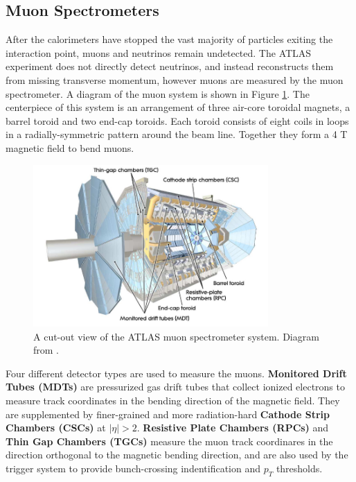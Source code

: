\subsection{Muon Spectrometers}
After the calorimeters have stopped the vast majority of particles exiting the interaction point, muons and neutrinos remain undetected. The ATLAS experiment does not directly detect neutrinos, and instead reconstructs them from missing transverse momentum, however muons are measured by the muon spectrometer. A diagram of the muon system is shown in Figure \ref{fig:muon_system}. The centerpiece of this system is an arrangement of three air-core toroidal magnets, a barrel toroid and two end-cap toroids. Each toroid consists of eight coils in loops in a radially-symmetric pattern around the beam line. Together they form a 4 T magnetic field to bend muons.

\begin{figure}[H]
    \centering
    \includegraphics[width=0.8\textwidth]{Figures/2/muon_system.png}
    \caption{A cut-out view of the ATLAS muon spectrometer system. Diagram from \cite{ATLASDesign}.}
    \label{fig:muon_system}
\end{figure}

Four different detector types are used to measure the muons. \textbf{Monitored Drift Tubes (MDTs)} are pressurized gas drift tubes that collect ionized electrons to measure track coordinates in the bending direction of the magnetic field. They are supplemented by finer-grained and more radiation-hard \textbf{Cathode Strip Chambers (CSCs)} at $|\eta | > 2$. \textbf{Resistive Plate Chambers (RPCs)} and \textbf{Thin Gap Chambers (TGCs)} measure the muon track coordinares in the direction orthogonal to the magnetic bending direction, and are also used by the trigger system to provide bunch-crossing indentification and $p_T$ thresholds.

